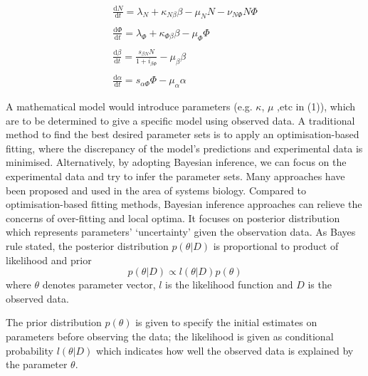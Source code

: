 \documentclass{article}
\begin{document}
\begin{equation} \label{eq:1}
\begin{array}{l}
\frac{\mathrm{d} N}{\mathrm{d} t}=\lambda_N+\kappa_{N\beta}\beta-\mu_NN-\nu_{N\Phi}N\Phi\\\\
\frac{\mathrm{d} \Phi}{\mathrm{d} t}=\lambda_\Phi+\kappa_{\Phi\beta}\beta-\mu_\Phi\Phi\\\\
\frac{\mathrm{d} \beta}{\mathrm{d} t}=\frac{s_{\beta N}N}{1+i_{\beta\Phi}}-\mu_\beta\beta\\\\
\frac{\mathrm{d} \alpha}{\mathrm{d} t}=s_{\alpha\Phi}\Phi-\mu_\alpha\alpha
\end{array}
\end{equation}

A mathematical model would introduce parameters (e.g. $\kappa$, $\mu$ ,etc in (1)), which are to be determined to 
give a specific model using observed data. A traditional method to find the best desired parameter sets 
is to apply an optimisation-based fitting, where the discrepancy of the model’s 
predictions and experimental data is minimised. Alternatively, by adopting Bayesian 
inference, we can focus on the experimental data and try to infer the parameter sets. 
Many approaches have been proposed and used in the area of systems biology\cite{ref:Stumpf}. Compared 
to optimisation-based fitting methods, Bayesian inference approaches can relieve the 
concerns of over-fitting and local optima. It focuses on posterior distribution which 
represents parameters’ ‘uncertainty’ given the observation data. As Bayes rule 
stated, the posterior distribution $p(\theta|D)$ is proportional to product of likelihood and 
prior
\begin{equation} \label{eq:2}
p(\theta|D)\propto l(\theta|D)p(\theta)
\end{equation}
where $\theta$ denotes parameter vector, $l$ is the likelihood function and $D$ is the observed data.

The prior distribution $p(\theta)$ is given to specify the initial estimates on 
parameters before observing the data; the likelihood is given as conditional 
probability $l(\theta|D)$ which indicates how well the observed data is explained by 
the parameter $\theta$.

\end{document}
